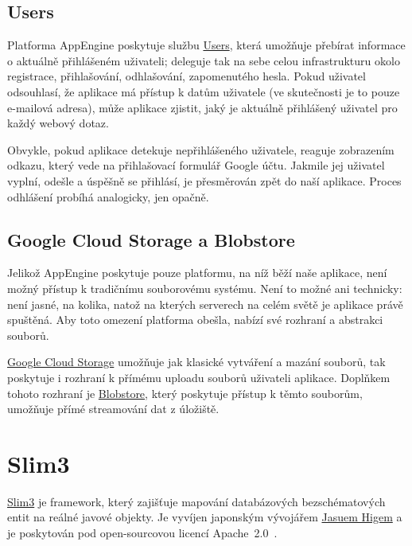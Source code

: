 \subsection{Users}

Platforma AppEngine poskytuje službu \href{https://developers.google.com/appengine/docs/java/users/}{Users}, která umožňuje přebírat informace o aktuálně přihlášeném uživateli; deleguje tak na sebe celou infrastrukturu okolo registrace, přihlašování, odhlašování, zapomenutého hesla.
Pokud uživatel odsouhlasí, že aplikace má přístup k datům uživatele (ve skutečnosti je to pouze e-mailová adresa), může aplikace zjistit, jaký je aktuálně přihlášený uživatel pro každý webový dotaz.

Obvykle, pokud aplikace detekuje nepřihlášeného uživatele, reaguje zobrazením odkazu, který vede na přihlašovací formulář Google účtu.
Jakmile jej uživatel vyplní,  odešle a úspěšně se přihlásí, je přesměrován zpět do naší aplikace.
Proces odhlášení probíhá analogicky, jen opačně.


\subsection{Google Cloud Storage a Blobstore}

Jelikož AppEngine poskytuje pouze platformu, na níž běží naše aplikace, není možný přístup k tradičnímu souborovému systému.
Není to možné ani technicky: není jasné, na kolika, natož na kterých serverech na celém světě je aplikace právě spuštěná.
Aby toto omezení platforma obešla, nabízí své rozhraní a abstrakci souborů.

\href{https://developers.google.com/appengine/docs/java/googlecloudstorageclient/}{Google Cloud Storage} umožňuje jak klasické vytváření a mazání souborů, tak poskytuje i rozhraní k přímému uploadu souborů uživateli aplikace.
Doplňkem tohoto rozhraní je \href{https://developers.google.com/appengine/docs/java/blobstore/}{Blobstore}, který poskytuje přístup k těmto souborům, umožňuje přímé streamování dat z úložiště.

\section{Slim3}

\href{https://sites.google.com/site/slim3appengine/}{Slim3} je framework, který zajišťuje mapování databázových bezschématových entit na reálné javové objekty.
Je vyvíjen japonským vývojářem \href{mailto:higayasuo@gmail.com}{Jasuem Higem} a je poskytován pod open-sourcovou licencí Apache~2.0~\cite{apache20}.

